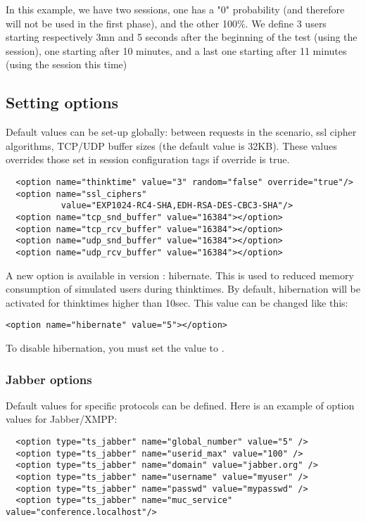 \documentclass{TSUNG-en}
\begin{document}
In this example, we have two sessions, one has a "0" probability (and
therefore will not be used in the first phase), and the other
100\%. We define 3 users starting respectively 3mn and 5 seconds
after the beginning of the test (using the 
session), one starting after 10 minutes, and a last one starting after
11 minutes (using the  session this time)

\subsection{Setting options}

\par Default values can be set-up globally:  between requests
in the scenario,  ssl cipher algorithms, TCP/UDP buffer sizes (the default
value is 32KB). These values overrides
those set in session configuration tags if override is true.
\begin{Verbatim}
  <option name="thinktime" value="3" random="false" override="true"/>
  <option name="ssl_ciphers"
           value="EXP1024-RC4-SHA,EDH-RSA-DES-CBC3-SHA"/>
  <option name="tcp_snd_buffer" value="16384"></option>
  <option name="tcp_rcv_buffer" value="16384"></option>
  <option name="udp_snd_buffer" value="16384"></option>
  <option name="udp_rcv_buffer" value="16384"></option>
\end{Verbatim}

A new option is available in version : hibernate. This
is used to reduced memory consumption of simulated users during
thinktimes. By default, hibernation will be activated for thinktimes
higher than 10sec. This value can be changed like this:

\begin{Verbatim}
<option name="hibernate" value="5"></option>
\end{Verbatim}

To disable hibernation, you must set the value to .

\subsubsection{Jabber options}
\label{sec:jabber-options}

Default values for specific protocols can be defined. Here is an
example of option values for Jabber/XMPP:

\begin{Verbatim}
  <option type="ts_jabber" name="global_number" value="5" />
  <option type="ts_jabber" name="userid_max" value="100" />
  <option type="ts_jabber" name="domain" value="jabber.org" />
  <option type="ts_jabber" name="username" value="myuser" />
  <option type="ts_jabber" name="passwd" value="mypasswd" />
  <option type="ts_jabber" name="muc_service" value="conference.localhost"/>
\end{Verbatim}
\end{document}
